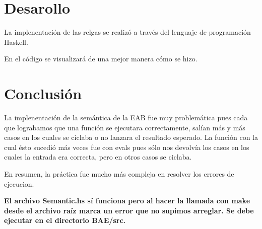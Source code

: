 \documentclass[12pt, letterpaper]{article}
\begin{document}
     \section*{Desarollo}
     La implenentación de las relgas se realizó a través del lenguaje de programación Haskell.\vspace{.3cm}

     En el código se visualizará de una mejor manera cómo se hizo.

     \section*{Conclusión}
     La implenentación de la semántica de la EAB fue muy problemática pues cada que lograbamos que una función se ejecutara 
     correctamente, salían más y más casos en los cuales se ciclaba o no lanzara el resultado esperado. La función con la 
     cual ésto sucedió más veces fue con evals pues sólo nos devolvía los casos en los cuales la entrada era correcta, pero en
     otros casos se ciclaba.\vspace{.3cm}

     En resumen, la práctica fue mucho más compleja en resolver los errores de ejecucion.\vspace{2cm}




     \textbf{El archivo Semantic.hs sí funciona pero al hacer la llamada con make desde el archivo raíz marca un error que no supimos arreglar.
     Se debe ejecutar en el directorio BAE/src.}









 
\end{document}
